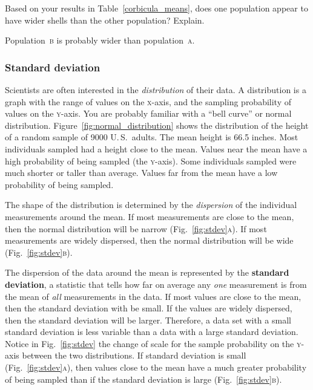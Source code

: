 \documentclass[12pt]{exam}
\newcommand*\AnswerBox[2]{%
    \parbox[t][#1]{0.92\textwidth}{%
    \begin{solution}#2\end{solution}}
}
\newcommand*\Popb{Population~\textsc{b}}
\newcommand*\popa{population~\textsc{a}} %
\begin{document}
\begin{questions}
\question\label{corbicula_mean_comparison}
Based on your results in Table~\ref{corbicula_means}, does one population appear to have wider shells than the other population? Explain.

\AnswerBox{2\baselineskip}{\Popb{} is probably wider than \popa{}.}


\subsubsection*{Standard deviation}

Scientists are often interested in the \emph{distribution} of their
data. A distribution is a graph with the range of values on the \textsc{x}-axis,
and the sampling probability of values on the \textsc{y}-axis. You are probably familiar
with a ``bell curve'' or normal distribution. Figure~\ref{fig:normal_distribution} 
shows the distribution of the height of a random sample of 9000 U.\,S.\ adults.
The mean height is 66.5 inches. Most individuals sampled had a height close
to the mean. Values near the mean have a high probability of being sampled 
(the \textsc{y}-axis). Some individuals sampled were much shorter or taller than average.
Values far from the mean have a low probability of being sampled.


The shape of the distribution is determined by the \emph{dispersion} of the 
individual measurements around the mean. If most measurements are close 
to the mean, then the normal distribution will be narrow (Fig.~\ref{fig:stdev}\textsc{a}).
If most measurements are widely dispersed, then the normal distribution will be
wide (Fig.~\ref{fig:stdev}\textsc{b}). 

The dispersion of the data around the mean is represented by the
\textbf{standard deviation}, a statistic that tells how far on average any
\emph{one} measurement is from the mean of \emph{all} measurements in 
the data. If most values are close to the mean, then the standard deviation
with be small. If the values are widely dispersed, then the standard deviation
will be larger. Therefore, a data set with a small standard deviation is less 
variable than a data with a large standard deviation. Notice in Fig.~\ref{fig:stdev} the change of scale 
for the sample probability on the
\textsc{y}-axis between the two distributions. If standard deviation is small 
(Fig.~\ref{fig:stdev}\textsc{a}), then values close to the mean have a much greater 
probability of being sampled than if the standard deviation is large (Fig.~\ref{fig:stdev}\textsc{b}).



\end{questions}
\end{document}
